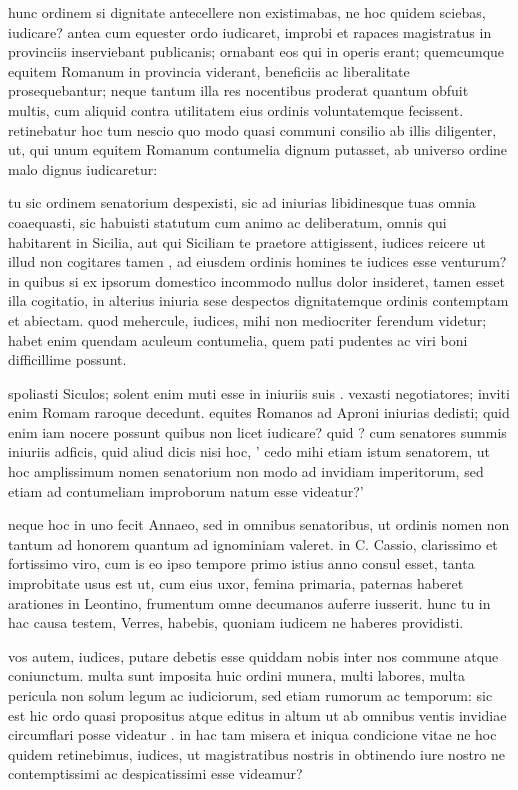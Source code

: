  hunc ordinem si dignitate antecellere non existimabas, ne hoc quidem sciebas, iudicare? antea cum equester ordo iudicaret, improbi et rapaces magistratus in provinciis inserviebant publicanis; ornabant eos qui in operis erant; quemcumque equitem Romanum in provincia viderant, beneficiis ac liberalitate prosequebantur; neque tantum illa res nocentibus proderat quantum obfuit multis, cum aliquid contra utilitatem eius ordinis voluntatemque fecissent. retinebatur hoc tum nescio quo modo quasi communi consilio ab illis diligenter, ut, qui unum equitem Romanum contumelia dignum putasset, ab universo ordine malo dignus iudicaretur:

 tu sic ordinem senatorium despexisti, sic ad iniurias libidinesque tuas omnia coaequasti, sic habuisti statutum cum animo ac deliberatum, omnis qui habitarent in Sicilia, aut qui Siciliam te praetore attigissent, iudices reicere ut illud non cogitares tamen , ad eiusdem ordinis homines te iudices esse venturum? in quibus si ex ipsorum domestico incommodo nullus dolor insideret, tamen esset illa cogitatio, in alterius iniuria sese despectos dignitatemque ordinis contemptam et abiectam. quod mehercule, iudices, mihi non mediocriter ferendum videtur; habet enim quendam aculeum contumelia, quem pati pudentes ac viri boni difficillime possunt.

 spoliasti Siculos; solent enim muti esse in iniuriis suis . vexasti negotiatores; inviti enim Romam raroque decedunt. equites Romanos ad Aproni iniurias dedisti; quid enim iam nocere possunt quibus non licet iudicare? quid ? cum senatores summis iniuriis adficis, quid aliud dicis nisi hoc, ' cedo mihi etiam istum senatorem, ut hoc amplissimum nomen senatorium non modo ad invidiam imperitorum, sed etiam ad contumeliam improborum natum esse videatur?'

 neque hoc in uno fecit Annaeo, sed in omnibus senatoribus, ut ordinis nomen non tantum ad honorem quantum ad ignominiam valeret. in C. Cassio, clarissimo et fortissimo viro, cum is eo ipso tempore primo istius anno consul esset, tanta improbitate usus est ut, cum eius uxor, femina primaria, paternas haberet arationes in Leontino, frumentum omne decumanos auferre iusserit. hunc tu in hac causa testem, Verres, habebis, quoniam iudicem ne haberes providisti.

 vos autem, iudices, putare debetis esse quiddam nobis inter nos commune atque coniunctum. multa sunt imposita huic ordini munera, multi labores, multa pericula non solum legum ac iudiciorum, sed etiam rumorum ac temporum: sic est hic ordo quasi propositus atque editus in altum ut ab omnibus ventis invidiae circumflari posse videatur . in hac tam misera et iniqua condicione vitae ne hoc quidem retinebimus, iudices, ut magistratibus nostris in obtinendo iure nostro ne contemptissimi ac despicatissimi esse videamur?

